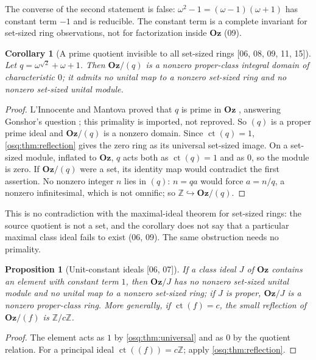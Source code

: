 \documentclass[11pt,letterpaper]{article}
\numberwithin{equation}{section}
\newtheorem{proposition}[proposition]{Proposition}
\newtheorem{corollary}[corollary]{Corollary}
\theoremstyle{definition}
\theoremstyle{remark}
\theoremstyle{plain}
\newcommand{\Oz}{\mathbf{Oz}}
\newcommand{\Z}{\mathbb Z}
\newcommand{\ct}{\operatorname{ct}}
\newcommand{\src}[1]{\textup{\textsf{[#1]}}}
\begin{document}
The converse of the second statement is false: $\omega^2-1=(\omega-1)(\omega+1)$ has
constant term $-1$ and is reducible. The constant term is a complete invariant for
set-sized ring observations, not for factorization inside $\Oz$ (09).

\begin{corollary}[A prime quotient invisible to all set-sized rings \src{06, 08, 09, 11, 15}]\label{osq:cor:primeexample}
Let $q=\omega^{\sqrt2}+\omega+1$. Then $\Oz/(q)$ is a nonzero proper-class integral domain
of characteristic $0$; it admits no unital map to a nonzero set-sized ring and no nonzero
set-sized unital module.
\end{corollary}
\begin{proof}
L'Innocente and Mantova proved that $q$ is prime in $\Oz$ \cite[Theorem~B]{LM}, answering
Gonshor's question \cite[p.~117]{Gonshor}; this primality is imported, not reproved. So
$(q)$ is a proper prime ideal and $\Oz/(q)$ is a nonzero domain. Since $\ct(q)=1$,
\cref{osq:thm:reflection} gives the zero ring as its universal set-sized image. On a
set-sized module, inflated to $\Oz$, $q$ acts both as $\ct(q)=1$ and as $0$, so the module is
zero. If $\Oz/(q)$ were a set, its identity map would contradict the first assertion. No
nonzero integer $n$ lies in $(q)$: $n=qa$ would force $a=n/q$, a nonzero infinitesimal, which
is not omnific; so $\Z\hookrightarrow\Oz/(q)$.
\end{proof}

This is no contradiction with the maximal-ideal theorem for set-sized rings: the source
quotient is not a set, and the corollary does not say that a particular maximal class ideal
fails to exist (06, 09). The same obstruction needs no primality.

\begin{proposition}[Unit-constant ideals \src{06, 07}]\label{osq:prop:unitconstant}
If a class ideal $J$ of $\Oz$ contains an element with constant term $1$, then $\Oz/J$
has no nonzero set-sized unital module and no unital map to a nonzero set-sized ring; if
$J$ is proper, $\Oz/J$ is a nonzero proper-class ring. More generally, if $\ct(f)=c$, the
small reflection of $\Oz/(f)$ is $\Z/c\Z$.
\end{proposition}
\begin{proof}
The element acts as $1$ by \cref{osq:thm:universal} and as $0$ by the quotient relation.
For a principal ideal $\ct((f))=c\Z$; apply \cref{osq:thm:reflection}.
\end{proof}
\end{document}
